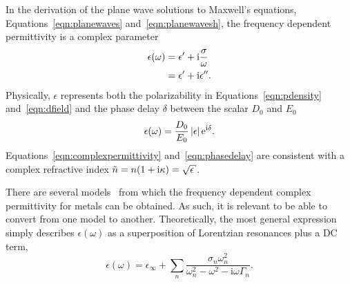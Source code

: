 In the derivation of the plane wave solutions to Maxwell's equations,
Equations~\ref{eqn:planewaves} and~\ref{eqn:planewavesh}, the
frequency dependent permittivity is a complex parameter
\begin{align}
 \epsilon(\omega) &= \epsilon^\prime + {\mathrm{i}} \frac{\sigma}{\omega}\\
                   &= \epsilon^\prime + {\mathrm{i}}\epsilon^{\prime\prime}.
																			\label{eqn:complexpermittivity}
\end{align}
Physically, $\epsilon$ represents both the polarizability in
Equations~\ref{eqn:pdensity} and~\ref{eqn:dfield} and the phase delay
$\delta$ between the scalar $D_0$ and
$E_0$
\begin{equation}
 \epsilon(\omega) = \frac{D_0}{E_0} \,|\epsilon| \,{\mathrm{e}}^{{\mathrm{i}} \delta}.
	\label{eqn:phasedelay}
\end{equation}
Equations~\ref{eqn:complexpermittivity} and~\ref{eqn:phasedelay} are
consistent with a complex refractive index $\tilde{n} = n(1+\mi \kappa) =
\sqrt{\epsilon}$.

There are several models~\cite{rakic1998optical} from which
the frequency dependent complex permittivity for metals can be obtained.
As such, it is relevant to be able to convert from one model to another.
Theoretically, the most general expression simply describes
$\epsilon(\omega)$ as a superposition of Lorentzian resonances plus a DC
term,
\begin{equation}
\epsilon(\omega)= \epsilon_\infty+\sum_n \frac{\sigma_n \omega_n^2} {\omega_n^2-\omega^2-{\mathrm{i}}\omega\Gamma_n}.
\label{eqn:meepdispersion}
\end{equation}

